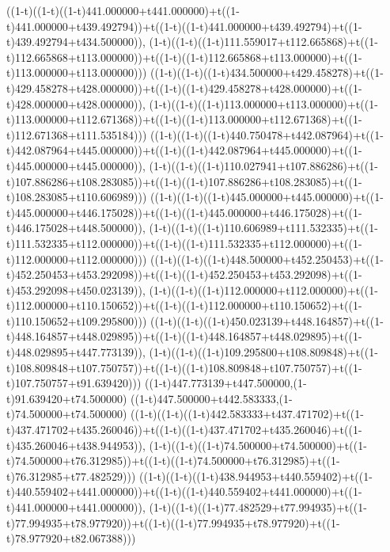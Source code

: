 ((1-t)((1-t)((1-t)441.000000+t441.000000)+t((1-t)441.000000+t439.492794))+t((1-t)((1-t)441.000000+t439.492794)+t((1-t)439.492794+t434.500000)),                                     (1-t)((1-t)((1-t)111.559017+t112.665868)+t((1-t)112.665868+t113.000000))+t((1-t)((1-t)112.665868+t113.000000)+t((1-t)113.000000+t113.000000)))
((1-t)((1-t)((1-t)434.500000+t429.458278)+t((1-t)429.458278+t428.000000))+t((1-t)((1-t)429.458278+t428.000000)+t((1-t)428.000000+t428.000000)),                                     (1-t)((1-t)((1-t)113.000000+t113.000000)+t((1-t)113.000000+t112.671368))+t((1-t)((1-t)113.000000+t112.671368)+t((1-t)112.671368+t111.535184)))
((1-t)((1-t)((1-t)440.750478+t442.087964)+t((1-t)442.087964+t445.000000))+t((1-t)((1-t)442.087964+t445.000000)+t((1-t)445.000000+t445.000000)),                                     (1-t)((1-t)((1-t)110.027941+t107.886286)+t((1-t)107.886286+t108.283085))+t((1-t)((1-t)107.886286+t108.283085)+t((1-t)108.283085+t110.606989)))
((1-t)((1-t)((1-t)445.000000+t445.000000)+t((1-t)445.000000+t446.175028))+t((1-t)((1-t)445.000000+t446.175028)+t((1-t)446.175028+t448.500000)),                                     (1-t)((1-t)((1-t)110.606989+t111.532335)+t((1-t)111.532335+t112.000000))+t((1-t)((1-t)111.532335+t112.000000)+t((1-t)112.000000+t112.000000)))
((1-t)((1-t)((1-t)448.500000+t452.250453)+t((1-t)452.250453+t453.292098))+t((1-t)((1-t)452.250453+t453.292098)+t((1-t)453.292098+t450.023139)),                                     (1-t)((1-t)((1-t)112.000000+t112.000000)+t((1-t)112.000000+t110.150652))+t((1-t)((1-t)112.000000+t110.150652)+t((1-t)110.150652+t109.295800)))
((1-t)((1-t)((1-t)450.023139+t448.164857)+t((1-t)448.164857+t448.029895))+t((1-t)((1-t)448.164857+t448.029895)+t((1-t)448.029895+t447.773139)),                                     (1-t)((1-t)((1-t)109.295800+t108.809848)+t((1-t)108.809848+t107.750757))+t((1-t)((1-t)108.809848+t107.750757)+t((1-t)107.750757+t91.639420)))
((1-t)447.773139+t447.500000,(1-t)91.639420+t74.500000)
((1-t)447.500000+t442.583333,(1-t)74.500000+t74.500000)
((1-t)((1-t)((1-t)442.583333+t437.471702)+t((1-t)437.471702+t435.260046))+t((1-t)((1-t)437.471702+t435.260046)+t((1-t)435.260046+t438.944953)),                                     (1-t)((1-t)((1-t)74.500000+t74.500000)+t((1-t)74.500000+t76.312985))+t((1-t)((1-t)74.500000+t76.312985)+t((1-t)76.312985+t77.482529)))
((1-t)((1-t)((1-t)438.944953+t440.559402)+t((1-t)440.559402+t441.000000))+t((1-t)((1-t)440.559402+t441.000000)+t((1-t)441.000000+t441.000000)),                                     (1-t)((1-t)((1-t)77.482529+t77.994935)+t((1-t)77.994935+t78.977920))+t((1-t)((1-t)77.994935+t78.977920)+t((1-t)78.977920+t82.067388)))
